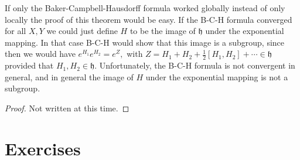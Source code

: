 \documentclass{amsbook}
\let \frak = \mathfrak
\theoremstyle{plain}
\numberwithin{equation}{chapter}
\numberwithin{theorem}{chapter}
\begin{document}
If only the Baker-Campbell-Hausdorff formula worked globally instead of only
locally the proof of this theorem would be easy. If the B-C-H formula
converged for all $X,Y$ we could just define $H$ to be the image of $\frak{h}$
under the exponential mapping. In that case B-C-H would show that this image
is a subgroup, since then we would have $e^{H_{1}}e^{H_{2}}=e^{Z},$ with
$Z=H_{1}+H_{2}+\frac{1}{2}\left[  H_{1},H_{2}\right]  +\cdots\in\frak{h}$
provided that $H_{1},H_{2}\in\frak{h}.$ Unfortunately, the B-C-H formula is
not convergent in general, and in general the image of $H$ under the
exponential mapping is not a subgroup.

\begin{proof}
Not written at this time.
\end{proof}

\section{Exercises}
\end{document}
